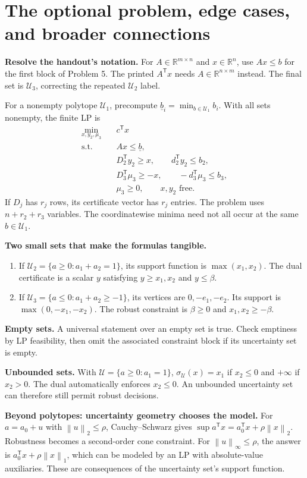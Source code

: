\documentclass[11pt]{article}
\newcommand{\R}{\mathbb R}
\newcommand{\T}{^{\mathsf T}}
\newcommand{\norm}[1]{\left\lVert#1\right\rVert}
\begin{document}
\newpage
\section{The optional problem, edge cases, and broader connections}
\textbf{Resolve the handout's notation.} For $A\in\R^{m\times n}$ and
$x\in\R^n$, use $Ax\le b$ for the first block of Problem 5.
The printed $A\T x$ needs $A\in\R^{n\times m}$ instead. The final set
is $\mathcal U_3$, correcting the repeated $\mathcal U_2$ label.

For a nonempty polytope $\mathcal U_1$, precompute
$\underline b_i=\min_{b\in\mathcal U_1}b_i$. With all sets nonempty,
the finite LP is
\[
\begin{aligned}
\min_{x,y_2,\mu_3}\quad &c\T x\\
\text{s.t.}\quad&Ax\le\underline b,\\
&D_2\T y_2\ge x,\qquad d_2\T y_2\le b_2,\\
&D_3\T\mu_3\ge-x,\qquad-d_3\T\mu_3\le b_3,\\
&\mu_3\ge0,\qquad x,y_2\text{ free}.
\end{aligned}
\]
If $D_j$ has $r_j$ rows, its certificate vector has $r_j$ entries.
The problem uses $n+r_2+r_3$ variables. The coordinatewise minima need
not all occur at the same $b\in\mathcal U_1$.

\textbf{Two small sets that make the formulas tangible.}
\begin{enumerate}
\item If $\mathcal U_2=\{a\ge0:a_1+a_2=1\}$, its support function is
$\max(x_1,x_2)$. The dual certificate is a scalar $y$ satisfying
$y\ge x_1,x_2$ and $y\le\beta$.
\item If $\mathcal U_3=\{a\le0:a_1+a_2\ge-1\}$, its vertices are
$0,-e_1,-e_2$. Its support is $\max(0,-x_1,-x_2)$.
The robust constraint is $\beta\ge0$ and $x_1,x_2\ge-\beta$.
\end{enumerate}

\textbf{Empty sets.} A universal statement over an empty set is true.
Check emptiness by LP feasibility, then omit the associated constraint
block if its uncertainty set is empty.

\textbf{Unbounded sets.} With $\mathcal U=\{a\ge0:a_1=1\}$,
$\sigma_{\mathcal U}(x)=x_1$ if $x_2\le0$ and $+\infty$ if $x_2>0$.
The dual automatically enforces $x_2\le0$. An unbounded uncertainty
set can therefore still permit robust decisions.

\textbf{Beyond polytopes: uncertainty geometry chooses the model.}
For $a=a_0+u$ with $\norm{u}_2\le\rho$, Cauchy--Schwarz gives
$\sup a\T x=a_0\T x+\rho\norm{x}_2$. Robustness becomes a second-order
cone constraint. For $\norm{u}_\infty\le\rho$, the answer is
$a_0\T x+\rho\norm{x}_1$, which can be modeled by an LP with absolute-value
auxiliaries. These are consequences of the uncertainty set's support function.
\end{document}
